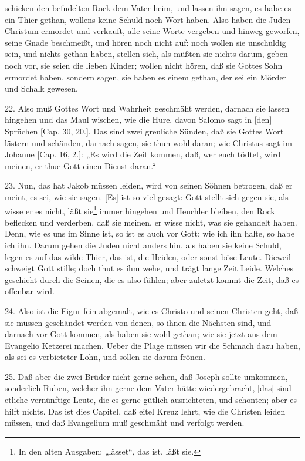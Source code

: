 schicken den befudelten Rock dem Vater heim, und lassen ihn sagen, es habe es ein Thier gethan, wollens keine Schuld noch Wort haben. Also haben die Juden Christum ermordet und verkauft, alle seine Worte vergeben und hinweg geworfen, seine Gnade beschmeißt, und hören noch nicht auf: noch wollen sie unschuldig sein, und nichts gethan haben, stellen sich, als müßten sie nichts darum, geben noch vor, sie seien die lieben Kinder; wollen nicht hören, daß sie Gottes Sohn ermordet haben, sondern sagen, sie haben es einem gethan, der sei ein Mörder und Schalk gewesen.

22. Also muß Gottes Wort und Wahrheit geschmäht werden, darnach sie lassen hingehen und das Maul wischen, wie die Hure, davon Salomo sagt in [den] Sprüchen [Cap. 30, 20.]. Das sind zwei greuliche Sünden, daß sie Gottes Wort lästern und schänden, darnach sagen, sie thun wohl daran; wie Christus sagt im Johanne [Cap. 16, 2.]: „Es wird die Zeit kommen, daß, wer euch tödtet, wird meinen, er thue Gott einen Dienst daran.“

23. Nun, das hat Jakob müssen leiden, wird von seinen Söhnen betrogen, daß er meint, es sei, wie sie sagen. [Es] ist so viel gesagt: Gott stellt sich gegen sie, als wisse er es nicht, läßt sie\footnote{In den alten Ausgaben: „lässet“, das ist, läßt sie.} immer hingehen und Heuchler bleiben, den Rock beflecken und verderben, daß sie meinen, er wisse nicht, was sie gehandelt haben. Denn, wie es uns im Sinne ist, so ist es auch vor Gott; wie ich ihn halte, so habe ich ihn. Darum gehen die Juden nicht anders hin, als haben sie keine Schuld, legen es auf das wilde Thier, das ist, die Heiden, oder sonst böse Leute. Dieweil schweigt Gott stille; doch thut es ihm wehe, und trägt lange Zeit Leide. Welches geschieht durch die Seinen, die es also fühlen; aber zuletzt kommt die Zeit, daß es offenbar wird.

24. Also ist die Figur fein abgemalt, wie es Christo und seinen Christen geht, daß sie müssen geschändet werden von denen, so ihnen die Nächsten sind, und darnach vor Gott kommen, als haben sie wohl gethan; wie sie jetzt aus dem Evangelio Ketzerei machen. Ueber die Plage müssen wir die Schmach dazu haben, als sei es verbieteter Lohn, und sollen sie darum frönen.

25. Daß aber die zwei Brüder nicht gerne sehen, daß Joseph sollte umkommen, sonderlich Ruben, welcher ihn gerne dem Vater hätte wiedergebracht, [das] sind etliche vernünftige Leute, die es gerne gütlich ausrichteten, und schonten; aber es hilft nichts. Das ist dies Capitel, daß eitel Kreuz lehrt, wie die Christen leiden müssen, und daß Evangelium muß geschmäht und verfolgt werden.

